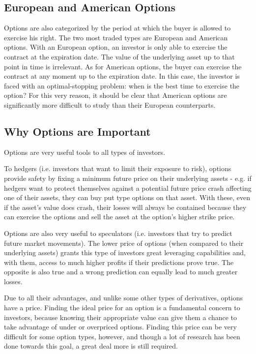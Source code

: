 \subsection{European and American Options}
\label{subsection:european and american options}
Options are also categorized by the period at which the buyer is allowed to exercise his right. The two most traded types are European and American options.
With an European option, an investor is only able to exercise the contract at the expiration date. The value of the underlying asset up to that point in time is irrelevant.
As for American options, the buyer can exercise the contract at any moment up to the expiration date.
In this case, the investor is faced with an optimal-stopping problem: when is the best time to exercise the option?
For this very reason, it should be clear that American options are significantly more difficult to study than their European counterparts.
\fi

\subsection{Why Options are Important}
\label{subsection:why options are important}
Options are very useful tools to all types of investors. 

To hedgers (i.e. investors that want to limit their exposure to risk), options provide safety by fixing a minimum future price on their underlying assets - e.g. if hedgers want to protect themselves against a potential future price crash affecting one of their assets, they can buy put type options on that asset. With these, even if the asset's value does crash, their losses will always be contained because they can exercise the options and sell the asset at the option's higher strike price.

Options are also very useful to speculators (i.e. investors that try to predict future market movements). The lower price of options (when compared to their underlying assets) grants this type of investors great leveraging capabilities and, with them, access to much higher profits if their predictions prove true. The opposite is also true and a wrong prediction can equally lead to much greater losses.

Due to all their advantages, and unlike some other types of derivatives, options have a price. Finding the ideal price for an option is a fundamental concern to investors, because knowing their appropriate value can give them a chance to take advantage of under or overpriced options.
Finding this price can be very difficult for some option types, however, and though a lot of research has been done towards this goal, a great deal more is still required.

